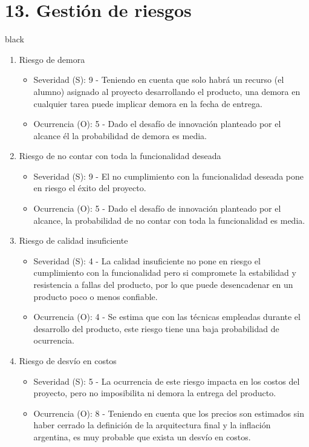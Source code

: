 \documentclass[
11pt, %
]{charter}
\begin{document}
\section{13. Gestión de riesgos}
\label{sec:riesgos}
\begin{consigna}{black}

\begin{enumerate}

\item Riesgo de demora
\begin{itemize}
	\item Severidad (S): 9 - Teniendo en cuenta que solo habrá un recurso (el alumno) asignado al proyecto desarrollando el producto, una demora en cualquier tarea puede implicar demora en la fecha de entrega.
	\item Ocurrencia (O): 5 - Dado el desafío de innovación planteado por el alcance él la probabilidad de demora es media.
\end{itemize}


\item Riesgo de no contar con toda la funcionalidad deseada
\begin{itemize}
	\item Severidad (S): 9 - El no cumplimiento con la funcionalidad deseada pone en riesgo el éxito del proyecto.
	\item Ocurrencia (O): 5 - Dado el desafío de innovación planteado por el alcance, la probabilidad de no contar con toda la funcionalidad es media.
\end{itemize}

\item Riesgo de calidad insuficiente
\begin{itemize}
	\item Severidad (S): 4 - La calidad insuficiente no pone en riesgo el cumplimiento con la funcionalidad pero si compromete la estabilidad y resistencia a fallas del producto, por lo que puede desencadenar en un producto poco o menos confiable.
	\item Ocurrencia (O): 4 - Se estima que con las técnicas empleadas durante el desarrollo del producto, este riesgo tiene una baja probabilidad de ocurrencia.
\end{itemize}


\item Riesgo de desvío en costos
\begin{itemize}
	\item Severidad (S): 5 - La ocurrencia de este riesgo impacta en los costos del proyecto, pero no imposibilita ni demora la entrega del producto.
	\item Ocurrencia (O): 8 - Teniendo en cuenta que los precios son estimados sin haber cerrado la definición de la arquitectura final y la inflación argentina, es muy probable que exista un desvío en costos.
\end{itemize}


\end{enumerate}
\end{consigna}
\end{document}
